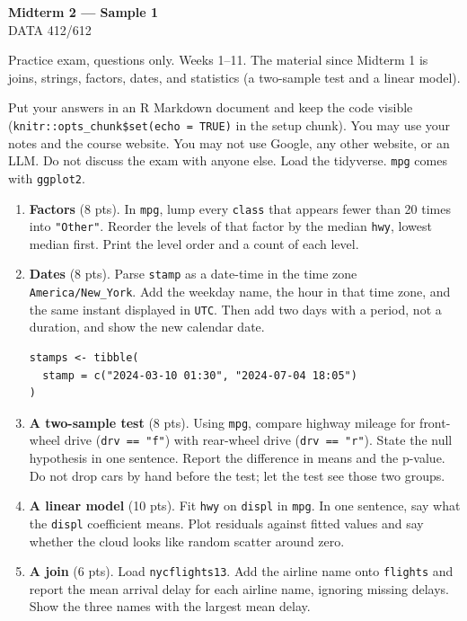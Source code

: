 \documentclass[11pt]{article}
\begin{document}
\begin{center}
{\LARGE\bfseries Midterm 2 --- Sample 1}\\[0.35em]
DATA 412/612
\end{center}

\vspace{0.2em}

Practice exam, questions only. Weeks 1--11. The material since
Midterm 1 is joins, strings, factors, dates, and statistics
(a two-sample test and a linear model).

Put your answers in an R Markdown document and keep the code visible
(\texttt{knitr::opts\_chunk\$set(echo = TRUE)} in the setup chunk).
You may use your notes and the course website.
You may not use Google, any other website, or an LLM.
Do not discuss the exam with anyone else.
Load the tidyverse. \texttt{mpg} comes with \texttt{ggplot2}.

\begin{enumerate}
\item \textbf{Factors} (8 pts).
In \texttt{mpg}, lump every \texttt{class} that appears fewer than
20 times into \texttt{"Other"}.
Reorder the levels of that factor by the median \texttt{hwy},
lowest median first.
Print the level order and a count of each level.

\item \textbf{Dates} (8 pts).
Parse \texttt{stamp} as a date-time in the time zone
\texttt{America/New\_York}.
Add the weekday name, the hour in that time zone, and the same
instant displayed in \texttt{UTC}.
Then add two days with a period, not a duration, and show the new
calendar date.

\begin{lstlisting}
stamps <- tibble(
  stamp = c("2024-03-10 01:30", "2024-07-04 18:05")
)
\end{lstlisting}

\item \textbf{A two-sample test} (8 pts).
Using \texttt{mpg}, compare highway mileage for front-wheel drive
(\texttt{drv == "f"}) with rear-wheel drive (\texttt{drv == "r"}).
State the null hypothesis in one sentence.
Report the difference in means and the p-value.
Do not drop cars by hand before the test; let the test see those
two groups.

\item \textbf{A linear model} (10 pts).
Fit \texttt{hwy} on \texttt{displ} in \texttt{mpg}.
In one sentence, say what the \texttt{displ} coefficient means.
Plot residuals against fitted values and say whether the cloud
looks like random scatter around zero.

\item \textbf{A join} (6 pts).
Load \texttt{nycflights13}. Add the airline name onto
\texttt{flights} and report the mean arrival delay for each airline
name, ignoring missing delays. Show the three names with the
largest mean delay.
\end{enumerate}
\end{document}
